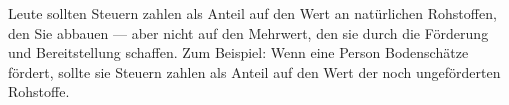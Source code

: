 Leute sollten Steuern zahlen als Anteil auf den Wert an natürlichen Rohstoffen, den Sie abbauen --- aber nicht auf den Mehrwert, den sie durch die Förderung und Bereitstellung schaffen.
Zum Beispiel: Wenn eine Person Bodenschätze fördert, sollte sie Steuern zahlen als Anteil auf den Wert der noch ungeförderten Rohstoffe.